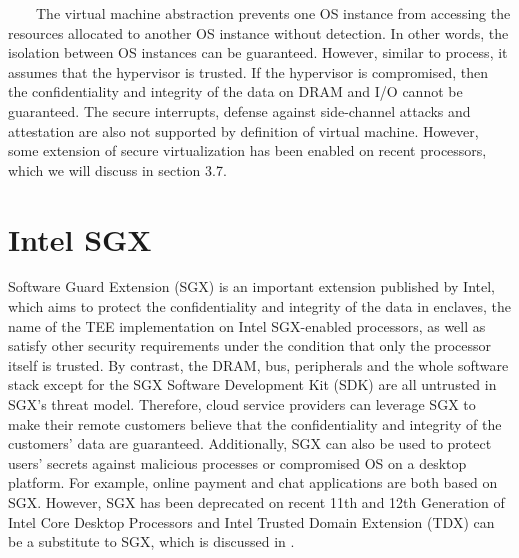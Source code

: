 \documentclass[12pt,twoside]{report}
\begin{document}
\ \ \ \ The virtual machine abstraction prevents one OS instance from accessing the resources allocated to another OS instance without detection. In other words, the isolation between OS instances can be guaranteed. However, similar to process, it assumes that the hypervisor is trusted. If the hypervisor is compromised, then the confidentiality and integrity of the data on DRAM and I/O cannot be guaranteed. The secure interrupts, defense against side-channel attacks and attestation are also not supported by definition of virtual machine. However, some extension of secure virtualization has been enabled on recent processors, which we will discuss in section 3.7.

\section{Intel SGX}

Software Guard Extension (SGX)\cite{mckeen2013innovative} is an important extension published by Intel, which aims to protect the confidentiality and integrity of the data in enclaves, the name of the TEE implementation on Intel SGX-enabled processors, as well as satisfy other security requirements under the condition that only the processor itself is trusted. By contrast, the DRAM, bus, peripherals and the whole software stack except for the SGX Software Development Kit (SDK) are all untrusted in SGX's threat model. Therefore, cloud service providers can leverage SGX to make their remote customers believe that the confidentiality and integrity of the customers' data are guaranteed. Additionally, SGX can also be used to protect users' secrets against malicious processes or compromised OS on a desktop platform. For example, online payment and chat applications are both based on SGX. However, SGX has been deprecated on recent 11th and 12th Generation of Intel Core Desktop Processors and Intel Trusted Domain Extension (TDX) can be a substitute to SGX, which is discussed in \cite{sgx-vs-tdx}.
\end{document}
